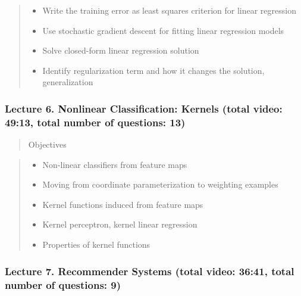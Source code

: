 \documentclass[]{article}
\providecommand{\tightlist}{%
  \setlength{\itemsep}{0pt}\setlength{\parskip}{0pt}}
\begin{document}
\begin{quote}
\begin{itemize}
\tightlist
\item
  Write the training error as least squares criterion for linear
  regression
\item
  Use stochastic gradient descent for fitting linear regression models
\item
  Solve closed-form linear regression solution
\item
  Identify regularization term and how it changes the solution,
  generalization
\end{itemize}
\end{quote}

\hypertarget{lecture-6.-nonlinear-classification-kernels-total-video-4913-total-number-of-questions-13}{%
\subsubsection{Lecture 6. Nonlinear Classification: Kernels (total
video: 49:13, total number of questions:
13)}\label{lecture-6.-nonlinear-classification-kernels-total-video-4913-total-number-of-questions-13}}

\begin{quote}
Objectives
\end{quote}

\begin{quote}
\begin{itemize}
\tightlist
\item
  Non-linear classifiers from feature maps
\item
  Moving from coordinate parameterization to weighting examples
\item
  Kernel functions induced from feature maps
\item
  Kernel perceptron, kernel linear regression
\item
  Properties of kernel functions
\end{itemize}
\end{quote}

\hypertarget{lecture-7.-recommender-systems-total-video-3641-total-number-of-questions-9}{%
\subsubsection{Lecture 7. Recommender Systems (total video: 36:41, total
number of questions:
9)}\label{lecture-7.-recommender-systems-total-video-3641-total-number-of-questions-9}}
\end{document}
